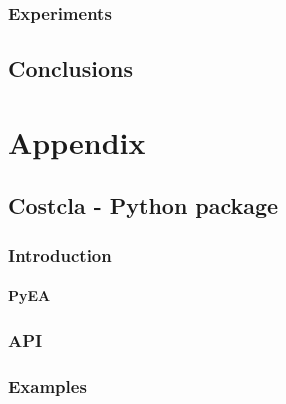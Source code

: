 \documentclass[twoside,openright,titlepage,numbers=noenddot,headinclude,%
               footinclude=true,cleardoublepage=empty,abstractoff,BCOR=5mm,%
               paper=a4,fontsize=11pt,ngerman,american,doublespace]{scrreprt}
\numberwithin{theorem}{chapter}
\numberwithin{definition}{chapter}
\numberwithin{algorithm}{chapter}
\numberwithin{figure}{chapter}
\numberwithin{table}{chapter}
\numberwithin{equation}{chapter}
\begin{document}
		\section{Experiments}
			
% 
% 
% 
 
\cleardoublepage
\makeatletter
\def\toclevel@chapter{-1}
\makeatother
\chapter{Conclusions}

\appendix
\cleardoublepage
\part{Appendix}
	\chapter{Costcla - Python package}
		\section{Introduction}
			\subsection{PyEA}
		\section{API}
		\section{Examples}

	\cleardoublepage

\cleardoublepage
\end{document}
